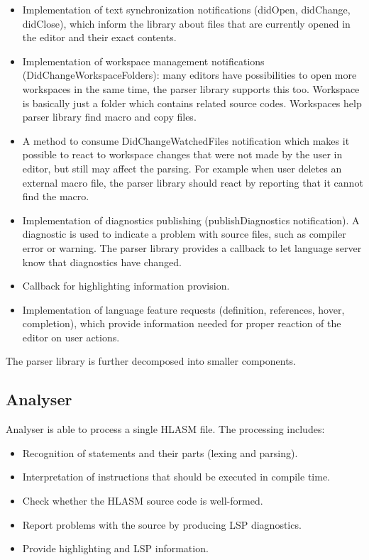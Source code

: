 \begin{itemize}
	\item Implementation of text synchronization notifications (didOpen, didChange, didClose), which inform the library about files that are currently opened in the editor and their exact contents.
	\item Implementation of workspace management notifications (DidChangeWorkspaceFolders): many editors have possibilities to open more workspaces in the same time, the parser library supports this too. Workspace is basically just a folder which contains related source codes. Workspaces help parser library find macro and copy files.
	\item A method to consume DidChangeWatchedFiles notification which makes it possible to react to workspace changes that were not made by the user in editor, but still may affect the parsing. For example when user deletes an external macro file, the parser library should react by reporting that it cannot find the macro.
	\item Implementation of diagnostics publishing (publishDiagnostics notification). A diagnostic is used to indicate a problem with source files, such as compiler error or warning. The parser library provides a callback to let language server know that diagnostics have changed.
	\item Callback for highlighting information provision.
	\item Implementation of language feature requests (definition, references, hover, completion), which provide information needed for proper reaction of the editor on user actions.
	
\end{itemize}

The parser library is further decomposed into smaller components.

\subsection{Analyser}

Analyser is able to process a single HLASM file. The processing includes:
\begin{itemize}
 \item Recognition of statements and their parts (lexing and parsing).
 \item Interpretation of instructions that should be executed in compile time.
 \item Check whether the HLASM source code is well-formed.
 \item Report problems with the source by producing LSP diagnostics.
 \item Provide highlighting and LSP information.
\end{itemize}



